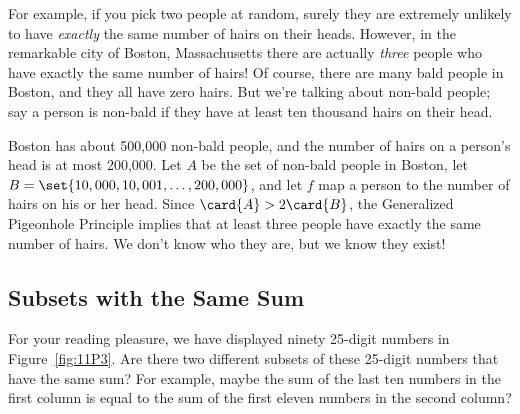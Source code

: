 For example, if you pick two people at random, surely they are extremely
unlikely to have \emph{exactly} the same number of hairs on their heads.
However, in the remarkable city of Boston, Massachusetts there are
actually \emph{three} people who have exactly the same number of hairs!
Of course, there are many bald people in Boston, and they all have zero
hairs.  But we're talking about non-bald people; say a person is non-bald
if they have at least ten thousand hairs on their head.

Boston has about 500,000 non-bald people, and the number of hairs on a
person's head is at most 200,000.  Let $A$ be the set of non-bald people
in Boston, let $B = \set{10,000, 10,001, \dots, 200,000}$, and let $f$ map
a person to the number of hairs on his or her head.  Since $\card{A} > 2
\card{B}$, the Generalized Pigeonhole Principle implies that at least
three people have exactly the same number of hairs.  We don't know who
they are, but we know they exist!

\subsection{Subsets with the Same Sum}

For your reading pleasure, we have displayed ninety 25-digit numbers
in Figure~\ref{fig:11P3}.  Are there two different subsets of these
25-digit numbers that have the same sum? For example, maybe the sum of
the last ten numbers in the first column is equal to the sum of the
first eleven numbers in the second column?

